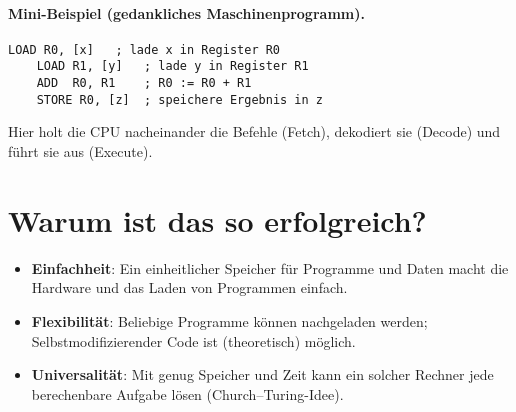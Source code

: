 \documentclass[../skript/main.tex]{subfiles}
\begin{document}
\paragraph{Mini-Beispiel (gedankliches Maschinenprogramm).}
\begin{lstlisting}[caption={Addition zweier Speicherstellen und Ablage des Ergebnisses}]
	LOAD R0, [x]   ; lade x in Register R0
	LOAD R1, [y]   ; lade y in Register R1
	ADD  R0, R1    ; R0 := R0 + R1
	STORE R0, [z]  ; speichere Ergebnis in z
\end{lstlisting}
Hier holt die CPU nacheinander die Befehle (Fetch), dekodiert sie (Decode) und führt sie aus (Execute).


\section{Warum ist das so erfolgreich?}
\begin{itemize}
	\item \textbf{Einfachheit}: Ein einheitlicher Speicher für Programme und Daten macht die Hardware und das Laden von Programmen einfach.
	\item \textbf{Flexibilität}: Beliebige Programme können nachgeladen werden; Selbstmodifizierender Code ist (theoretisch) möglich.
	\item \textbf{Universalität}: Mit genug Speicher und Zeit kann ein solcher Rechner jede berechenbare Aufgabe lösen (Church–Turing-Idee).
\end{itemize}

\end{document}
